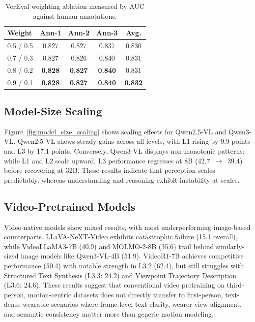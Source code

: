 \begin{table}[t!]
\centering
\caption{VerEval weighting ablation measured by AUC against human annotations.}
\label{tab:vereval_weighting_ablation}
\small
\begin{tabular}{lcccc}
\toprule
\textbf{Weight} & \textbf{Ann-1} & \textbf{Ann-2} & \textbf{Ann-3} & \textbf{Avg.} \\
\midrule
0.5 / 0.5 & 0.827 & 0.827 & 0.837 & 0.830 \\
0.7 / 0.3 & 0.827 & 0.826 & 0.840 & 0.831 \\
0.8 / 0.2 & \textbf{0.828} & \textbf{0.827} & \textbf{0.840} & 0.831 \\
0.9 / 0.1 & \textbf{0.828} & \textbf{0.827} & \textbf{0.840} & \textbf{0.832} \\
\bottomrule
\end{tabular}
\end{table}

\subsection{Model-Size Scaling}
\label{sec:scaling}
Figure~\ref{fig:model_size_scaling} shows scaling effects for Qwen2.5-VL and Qwen3-VL. Qwen2.5-VL shows steady gains across all levels, with L1 rising by 9.9 points and L3 by 17.1 points. Conversely, Qwen3-VL displays non-monotonic patterns: while L1 and L2 scale upward, L3 performance regresses at 8B (42.7~$\to$~39.4) before recovering at 32B. These results indicate that perception scales predictably, whereas understanding and reasoning exhibit instability at scales.

\subsection{Video-Pretrained Models}
\label{sec:video_native}
Video-native models show mixed results, with most underperforming image-based counterparts. LLaVA-NeXT-Video exhibits catastrophic failure (15.1 overall), while VideoLLaMA3-7B (40.9) and MOLMO-2-8B (35.6) trail behind similarly-sized image models like Qwen3-VL-4B (51.9). VideoR1-7B achieves competitive performance (50.4) with notable strength in L3.2 (62.4), but still struggles with Structured Text Synthesis (L3.3: 24.2) and Viewpoint Trajectory Description (L3.6: 24.6). These results suggest that conventional video pretraining on third-person, motion-centric datasets does not directly transfer to first-person, text-dense wearable scenarios where frame-level text clarity, wearer-view alignment, and semantic consistency matter more than generic motion modeling.


